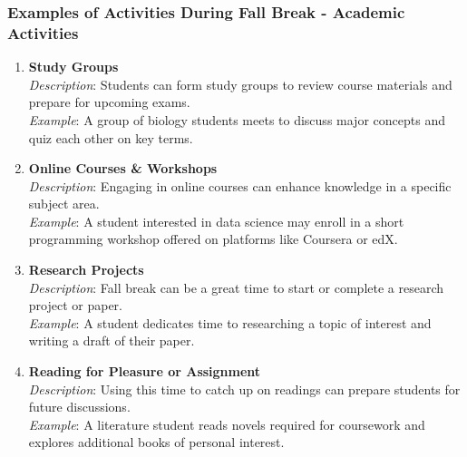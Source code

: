 \documentclass[aspectratio=169]{beamer}
\begin{document}
\begin{frame}[fragile]
    \frametitle{Examples of Activities During Fall Break - Academic Activities}
    \begin{enumerate}
        \item \textbf{Study Groups}\\
        \textit{Description}: Students can form study groups to review course materials and prepare for upcoming exams.\\
        \textit{Example}: A group of biology students meets to discuss major concepts and quiz each other on key terms.

        \item \textbf{Online Courses \& Workshops}\\
        \textit{Description}: Engaging in online courses can enhance knowledge in a specific subject area.\\
        \textit{Example}: A student interested in data science may enroll in a short programming workshop offered on platforms like Coursera or edX.

        \item \textbf{Research Projects}\\
        \textit{Description}: Fall break can be a great time to start or complete a research project or paper.\\
        \textit{Example}: A student dedicates time to researching a topic of interest and writing a draft of their paper.

        \item \textbf{Reading for Pleasure or Assignment}\\
        \textit{Description}: Using this time to catch up on readings can prepare students for future discussions.\\
        \textit{Example}: A literature student reads novels required for coursework and explores additional books of personal interest.
    \end{enumerate}
\end{frame}
\end{document}
